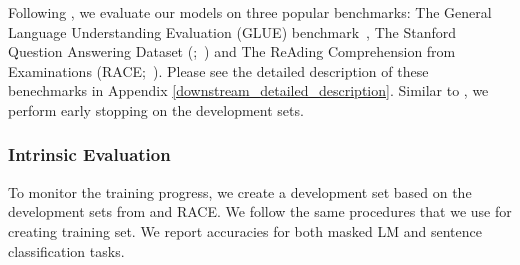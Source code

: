 Following \citep{yang2019xlnet,liu2019roberta}, we evaluate our models on three popular benchmarks: The General Language Understanding Evaluation (GLUE) benchmark~\citep{wang-etal-2018-glue}, The Stanford Question Answering Dataset (\squad;~\citealp{rajpurkar-etal-2016-squad,rajpurkar-etal-2018-know}) and The ReAding Comprehension from Examinations (RACE;~\citealp{lai2017race}). Please see the detailed description of these benechmarks in Appendix \ref{downstream_detailed_description}. Similar to \cite{liu2019roberta}, we perform early stopping on the development sets.

\subsubsection{Intrinsic Evaluation}

To monitor the training progress, we create a development set based on the development sets from \squad and RACE. We follow the same procedures that we use for creating training set. We report accuracies for both masked LM and sentence classification tasks. 